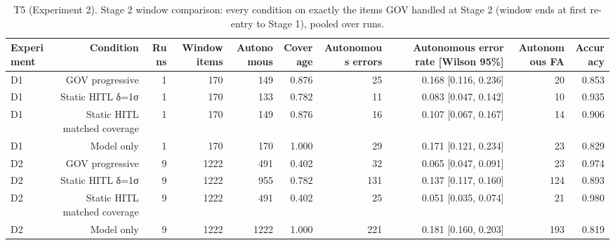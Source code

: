 \begin{table}[t]\centering\small
\caption{T5 (Experiment 2). Stage 2 window comparison: every condition on exactly the items GOV handled at Stage 2 (window ends at first re-entry to Stage 1), pooled over runs.}
\label{tab:T5_stage2_window_exp2}
\begin{tabular}{lrrrrrrrrr}\hline
Experiment & Condition & Runs & Window items & Autonomous & Coverage & Autonomous errors & Autonomous error rate [Wilson 95\%] & Autonomous FA & Accuracy \\ \hline
D1 & GOV progressive & 1 & 170 & 149 & 0.876 & 25 & 0.168 [0.116, 0.236] & 20 & 0.853 \\
D1 & Static HITL δ=1σ & 1 & 170 & 133 & 0.782 & 11 & 0.083 [0.047, 0.142] & 10 & 0.935 \\
D1 & Static HITL matched coverage & 1 & 170 & 149 & 0.876 & 16 & 0.107 [0.067, 0.167] & 14 & 0.906 \\
D1 & Model only & 1 & 170 & 170 & 1.000 & 29 & 0.171 [0.121, 0.234] & 23 & 0.829 \\
D2 & GOV progressive & 9 & 1222 & 491 & 0.402 & 32 & 0.065 [0.047, 0.091] & 23 & 0.974 \\
D2 & Static HITL δ=1σ & 9 & 1222 & 955 & 0.782 & 131 & 0.137 [0.117, 0.160] & 124 & 0.893 \\
D2 & Static HITL matched coverage & 9 & 1222 & 491 & 0.402 & 25 & 0.051 [0.035, 0.074] & 21 & 0.980 \\
D2 & Model only & 9 & 1222 & 1222 & 1.000 & 221 & 0.181 [0.160, 0.203] & 193 & 0.819 \\
\hline\end{tabular}
\end{table}
